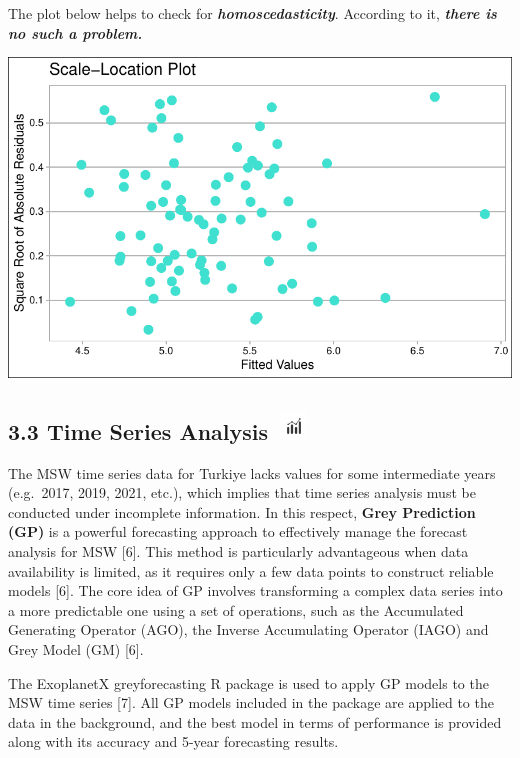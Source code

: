 \documentclass[
  11pt,
  a4paper,
  DIV=11,
  numbers=noendperiod]{scrartcl}
\begin{document}
The plot below helps to check for \textbf{\emph{homoscedasticity}}.
According to it, \textbf{\emph{there is no such a problem.}}

\includegraphics{project_files/figure-pdf/unnamed-chunk-44-1.pdf}

\subsection[{3.3 Time Series Analysis} ]{\texorpdfstring{{3.3 Time
Series Analysis}
\protect\includegraphics[width=0.375in,height=0.29167in]{assets/images/model.jpg}}{3.3 Time Series Analysis }}\label{time-series-analysis}

The MSW time series data for Turkiye lacks values for some intermediate
years (e.g.~2017, 2019, 2021, etc.), which implies that time series
analysis must be conducted under incomplete information. In this
respect, \textbf{Grey Prediction (GP)} is a powerful forecasting
approach to effectively manage the forecast analysis for MSW {[}6{]}.
This method is particularly advantageous when data availability is
limited, as it requires only a few data points to construct reliable
models {[}6{]}. The core idea of GP involves transforming a complex data
series into a more predictable one using a set of operations, such as
the Accumulated Generating Operator (AGO), the Inverse Accumulating
Operator (IAGO) and Grey Model (GM) {[}6{]}.

The ExoplanetX greyforecasting R package is used to apply GP models to
the MSW time series {[}7{]}. All GP models included in the package are
applied to the data in the background, and the best model in terms of
performance is provided along with its accuracy and 5-year forecasting
results.
\end{document}
